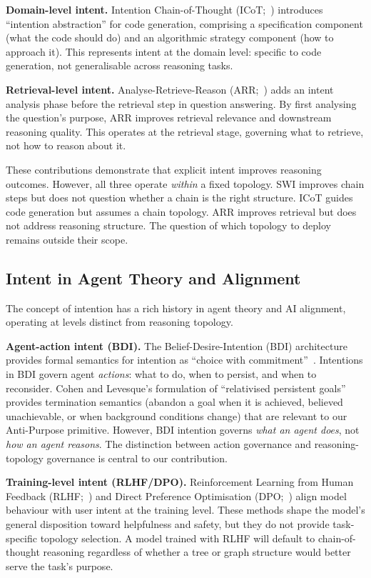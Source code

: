 \documentclass[11pt,a4paper]{article}
\begin{document}
\textbf{Domain-level intent.} Intention Chain-of-Thought (ICoT;~\citealt{li2025icot}) introduces ``intention abstraction'' for code generation, comprising a specification component (what the code should do) and an algorithmic strategy component (how to approach it). This represents intent at the domain level: specific to code generation, not generalisable across reasoning tasks.

\textbf{Retrieval-level intent.} Analyse-Retrieve-Reason (ARR;~\citealt{yin2025arr}) adds an intent analysis phase before the retrieval step in question answering. By first analysing the question's purpose, ARR improves retrieval relevance and downstream reasoning quality. This operates at the retrieval stage, governing what to retrieve, not how to reason about it.

These contributions demonstrate that explicit intent improves reasoning outcomes. However, all three operate \emph{within} a fixed topology. SWI improves chain steps but does not question whether a chain is the right structure. ICoT guides code generation but assumes a chain topology. ARR improves retrieval but does not address reasoning structure. The question of which topology to deploy remains outside their scope.

\subsection{Intent in Agent Theory and Alignment}

The concept of intention has a rich history in agent theory and AI alignment, operating at levels distinct from reasoning topology.

\textbf{Agent-action intent (BDI).} The Belief-Desire-Intention (BDI) architecture~\citep{bratman1987intention,cohen1990intention,rao1995bdi} provides formal semantics for intention as ``choice with commitment''~\citep{cohen1990intention}. Intentions in BDI govern agent \emph{actions}: what to do, when to persist, and when to reconsider. Cohen and Levesque's formulation of ``relativised persistent goals'' provides termination semantics (abandon a goal when it is achieved, believed unachievable, or when background conditions change) that are relevant to our Anti-Purpose primitive. However, BDI intention governs \emph{what an agent does}, not \emph{how an agent reasons}. The distinction between action governance and reasoning-topology governance is central to our contribution.

\textbf{Training-level intent (RLHF/DPO).} Reinforcement Learning from Human Feedback (RLHF;~\citealt{ouyang2022instructgpt}) and Direct Preference Optimisation (DPO;~\citealt{rafailov2023dpo}) align model behaviour with user intent at the training level. These methods shape the model's general disposition toward helpfulness and safety, but they do not provide task-specific topology selection. A model trained with RLHF will default to chain-of-thought reasoning regardless of whether a tree or graph structure would better serve the task's purpose.
\end{document}
